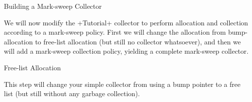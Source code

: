 \begin{section}{Building a Mark-sweep Collector}
\label{sec:buildingamarksweepcollector}

We will now modify the \spverb+Tutorial+ collector to perform allocation and collection according to a mark-sweep policy. First we will change the allocation from bump-allocation to free-list allocation (but still no collector whatsoever), and then we will add a mark-sweep collection policy, yielding a complete mark-sweep collector.

\begin{subsection}{Free-list Allocation}

This step will change your simple collector from using a bump pointer to a free list (but still without any garbage collection).


\end{subsection}
\end{section}
